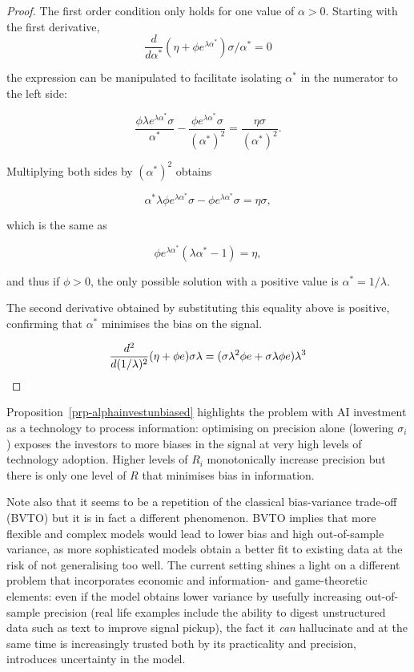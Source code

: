 \documentclass[
]{article}
\theoremstyle{plain}
\theoremstyle{remark}
\begin{document}
\begin{proof}
The first order condition only holds for one value of \(\alpha > 0\).
Starting with the first derivative, \[
\frac{d}{d \alpha^*} (\eta + \phi e^{\lambda \alpha^*}) \sigma / \alpha^* = 0
\]

the expression can be manipulated to facilitate isolating \(\alpha^*\)
in the numerator to the left side:

\[
\frac{\phi \lambda e^{\lambda \alpha^*} \sigma}{\alpha^*} - \frac{\phi e^{\lambda \alpha^*}\sigma}{(\alpha^*)^2} = \frac{\eta \sigma}{(\alpha^*)^2}.
\]

Multiplying both sides by \((\alpha^*)^2\) obtains

\[
\alpha^* \lambda \phi e^{\lambda \alpha^*} \sigma - \phi e^{\lambda \alpha^*}\sigma = \eta \sigma,
\]

which is the same as

\[
\phi e^{\lambda \alpha^*} (\lambda \alpha^* - 1)= \eta,
\]

and thus if \(\phi > 0\), the only possible solution with a positive
value is \(\alpha^* = 1/\lambda\).

The second derivative obtained by substituting this equality above is
positive, confirming that \(\alpha^*\) minimises the bias on the signal.

\[
\frac{d^2}{d (1/\lambda)^2} (\eta + \phi e) \sigma \lambda = (\sigma \lambda^2 \phi e + \sigma \lambda \phi e)\lambda^3 \\
\]
\end{proof}

Proposition~\ref{prp-alphainvestunbiased} highlights the problem with AI
investment as a technology to process information: optimising on
precision alone (lowering \(\sigma_i\)) exposes the investors to more
biases in the signal at very high levels of technology adoption. Higher
levels of \(R_i\) monotonically increase precision but there is only one
level of \(R\) that minimises bias in information.

Note also that it seems to be a repetition of the classical
bias-variance trade-off (BVTO) but it is in fact a different phenomenon.
BVTO implies that more flexible and complex models would lead to lower
bias and high out-of-sample variance, as more sophisticated models
obtain a better fit to existing data at the risk of not generalising too
well. The current setting shines a light on a different problem that
incorporates economic and information- and game-theoretic elements: even
if the model obtains lower variance by usefully increasing out-of-sample
precision (real life examples include the ability to digest unstructured
data such as text to improve signal pickup), the fact it \emph{can}
hallucinate and at the same time is increasingly trusted both by its
practicality and precision, introduces uncertainty in the model.
\end{document}
